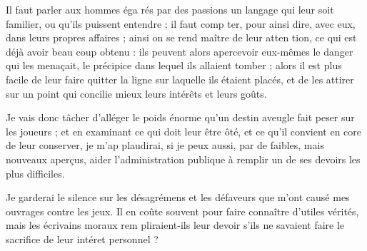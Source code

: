 Il faut parler aux hommes éga%
rés par des passions un langage
qui leur soit familier, ou qu'ils
puissent entendre ; il faut comp%
ter, pour ainsi dire, avec eux,
dans leurs propres affaires ; ainsi
on se rend maître de leur atten%
tion, ce qui est déjà avoir beau%
coup obtenu : ils peuvent alors
apercevoir eux-mêmes le danger
qui les menaçait, le précipice
dans lequel ils allaient tomber ;
alors il est plus facile de leur faire
quitter la ligne sur laquelle ils
étaient placés, et de les attirer sur
un point qui concilie mieux leurs
intérêts et leurs goûts.

Je vais donc tâcher d'alléger
le poids énorme qu'un destin
aveugle fait peser sur les joueurs ;
et en examinant ce qui doit leur
être ôté, et ce qu'il convient en%
core de leur conserver, je m'ap%
plaudirai, si je peux aussi, par de
faibles, mais nouveaux aperçus,
aider l'administration publique à
remplir un de ses devoirs les plus
difficiles.

Je garderai le silence sur les
désagrémens et les défaveurs que
m'ont causé mes ouvrages contre
les jeux. Il en coûte souvent pour
faire connaître d'utiles vérités,
mais les écrivains moraux rem%
pliraient-ils leur devoir s'ils ne
savaient faire le sacrifice de leur
intéret personnel ?
